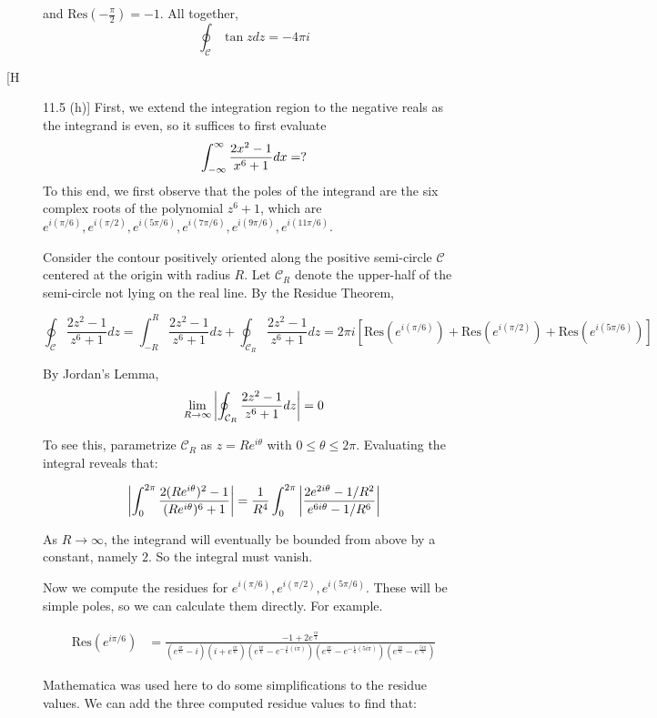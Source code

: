 \documentclass[12pt]{article}%
\newcommand{\C}{\mathcal{C}}
\begin{document}
\begin{description}
   and $\text{Res}(-\frac{\pi}{2}) = -1$. All together,
   \[ \oint_{\C} \tan{z} dz = -4 \pi i\]

  \item[[H] 11.5 (h)]
  First, we extend the integration region to the negative reals as the integrand is even, so it suffices to first evaluate $$ \int_{-\infty}^{\infty} \frac{2x^2 -1}{x^6 + 1} dx = ?$$
  To this end, we first observe that the poles of the integrand are the six complex roots of the polynomial $z^6 + 1$, which are $e^{i(\pi/6)}, e^{i(\pi/2)}, e^{i(5\pi/6)},e^{i(7\pi/6)},e^{i(9\pi/6)},e^{i(11\pi/6)}$.

  Consider the contour positively oriented along the positive semi-circle $\C$ centered at the origin with radius $R$. Let $\C_R$ denote the upper-half of the semi-circle not lying on the real line. By the Residue Theorem,

  \[ \oint_{\C} \frac{2z^2 -1}{z^6 + 1} dz =  \int_{-R}^R \frac{2z^2 -1}{z^6 + 1} dz + \oint_{\C_R} \frac{2z^2 -1}{z^6 + 1} dz = 2 \pi i \left[\text{Res}(e^{i(\pi/6)}) + \text{Res}(e^{i(\pi/2)}) + \text{Res}(e^{i(5\pi/6)})\right]\]

  By Jordan's Lemma,
  \[  \lim_{R \rightarrow \infty} \abs{\oint_{\C_R} \frac{2z^2 -1}{z^6 + 1} dz} = 0 \]

  To see this, parametrize $\C_R$ as $z = Re^{i\theta}$ with $0 \leq \theta \leq 2\pi$. Evaluating the integral reveals that:

  \[\abs{\int_{0}^{2\pi} \frac{2(Re^{i\theta})^2 - 1}{(Re^{i\theta})^6 + 1}} = \frac{1}{R^4}\int_{0}^{2\pi}  \abs{\frac{2e^{2i\theta} - 1/R^2}{e^{6i\theta} - 1/R^6}} \]

  As $R \rightarrow \infty$, the integrand will eventually be bounded from above by a constant, namely $2$. So the integral must vanish.

  Now we compute the residues for $e^{i(\pi/6)}, e^{i(\pi/2)}, e^{i(5\pi/6)}$. These will be simple poles, so we can calculate them directly. For example.

    \begin{align*}
        \text{Res}(e^{i\pi/6}) & = \frac{-1+2 e^{\frac{i \pi }{3}}}{\left(e^{\frac{i \pi }{6}}-i\right) \left(i+e^{\frac{i \pi }{6}}\right) \left(e^{\frac{i \pi }{6}}-e^{-\frac{1}{6} (i \pi )}\right) \left(e^{\frac{i \pi }{6}}-e^{-\frac{1}{6} (5 i \pi )}\right) \left(e^{\frac{i \pi }{6}}-e^{\frac{5 i \pi }{6}}\right)}
    \end{align*}

    Mathematica was used here to do some simplifications to the residue values. We can add the three computed residue values to find that:


\end{description}
\end{document}
